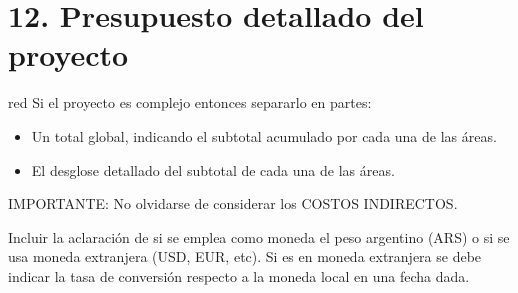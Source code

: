 \documentclass[
    11pt, %
]{charter}
\begin{document}
    \section{12. Presupuesto detallado del proyecto}
    \label{sec:presupuesto}

    \begin{consigna}{red}
        Si el proyecto es complejo entonces separarlo en partes:
        \begin{itemize}
            \item Un total global, indicando el subtotal acumulado por cada una de las áreas.
            \item El desglose detallado del subtotal de cada una de las áreas.
        \end{itemize}

        IMPORTANTE: No olvidarse de considerar los COSTOS INDIRECTOS.

        Incluir la aclaración de si se emplea como moneda el peso argentino (ARS) o si se usa moneda extranjera (USD, EUR, etc). Si es en moneda extranjera se debe indicar la tasa de conversión respecto a la moneda local en una fecha dada.

    \end{consigna}
\end{document}
